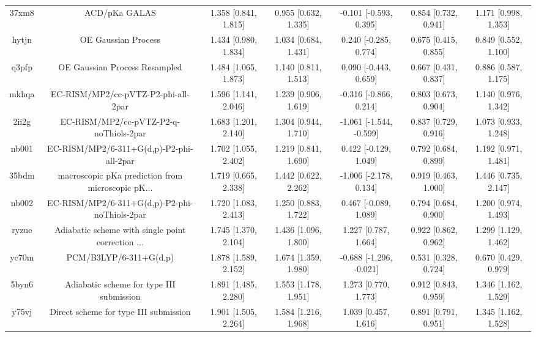 \documentclass{article}
\begin{document}
\begin{center}
\begin{longtable}{|ccccccc|}
 37xm8 &                                      ACD/pKa GALAS &    1.358 [0.841, 1.815] &   0.955 [0.632, 1.335] &    -0.101 [-0.593, 0.395] &  0.854 [0.732, 0.941] &    1.171 [0.998, 1.353] \\
 hytjn &                                OE Gaussian Process &    1.434 [0.980, 1.834] &   1.034 [0.684, 1.431] &     0.240 [-0.285, 0.774] &  0.675 [0.415, 0.855] &    0.849 [0.552, 1.100] \\
 q3pfp &                      OE Gaussian Process Resampled &    1.484 [1.065, 1.873] &   1.140 [0.811, 1.513] &     0.090 [-0.443, 0.659] &  0.667 [0.431, 0.837] &    0.886 [0.587, 1.175] \\
 mkhqa &                EC-RISM/MP2/cc-pVTZ-P2-phi-all-2par &    1.596 [1.141, 2.046] &   1.239 [0.906, 1.619] &    -0.316 [-0.866, 0.214] &  0.803 [0.673, 0.904] &    1.140 [0.976, 1.342] \\
 2ii2g &             EC-RISM/MP2/cc-pVTZ-P2-q-noThiols-2par &    1.683 [1.201, 2.140] &   1.304 [0.944, 1.710] &   -1.061 [-1.544, -0.599] &  0.837 [0.729, 0.916] &    1.073 [0.933, 1.248] \\
 nb001 &           EC-RISM/MP2/6-311+G(d,p)-P2-phi-all-2par &    1.702 [1.055, 2.402] &   1.219 [0.841, 1.690] &     0.422 [-0.129, 1.049] &  0.792 [0.684, 0.899] &    1.192 [0.971, 1.481] \\
 35bdm &  macroscopic pKa prediction from microscopic pK... &    1.719 [0.665, 2.338] &   1.442 [0.622, 2.262] &    -1.006 [-2.178, 0.134] &  0.919 [0.463, 1.000] &    1.446 [0.735, 2.147] \\
 nb002 &      EC-RISM/MP2/6-311+G(d,p)-P2-phi-noThiols-2par &    1.720 [1.083, 2.413] &   1.250 [0.883, 1.722] &     0.467 [-0.089, 1.089] &  0.794 [0.684, 0.900] &    1.200 [0.974, 1.493] \\
 ryzue &  Adiabatic scheme with single point correction ... &    1.745 [1.370, 2.104] &   1.436 [1.096, 1.800] &      1.227 [0.787, 1.664] &  0.922 [0.862, 0.962] &    1.299 [1.129, 1.462] \\
 yc70m &                             PCM/B3LYP/6-311+G(d,p) &    1.878 [1.589, 2.152] &   1.674 [1.359, 1.980] &   -0.688 [-1.296, -0.021] &  0.531 [0.328, 0.724] &    0.670 [0.429, 0.979] \\
 5byn6 &           Adiabatic scheme for type III submission &    1.891 [1.485, 2.280] &   1.553 [1.178, 1.951] &      1.273 [0.770, 1.773] &  0.912 [0.843, 0.959] &    1.346 [1.162, 1.529] \\
 y75vj &              Direct scheme for type III submission &    1.901 [1.505, 2.264] &   1.584 [1.216, 1.968] &      1.039 [0.457, 1.616] &  0.891 [0.791, 0.951] &    1.345 [1.162, 1.528] \\

\end{longtable}
\end{center}
\end{document}
